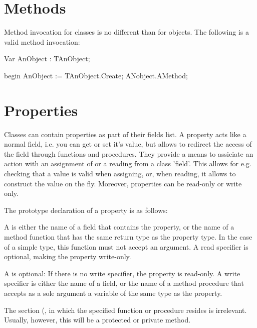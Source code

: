 \documentclass{report}
\begin{document}
\section{Methods}

Method invocation for classes is no different than for objects. The
following is a valid method invocation:
\begin{listing}
Var  AnObject : TAnObject;

begin
  AnObject := TAnObject.Create;
  ANobject.AMethod;
\end{listing}

\section{Properties}

Classes can contain properties as part of their fields list. A property
acts like a normal field, i.e. you can get or set it's value, but 
allows to redirect the access of the field through functions and 
procedures. They provide a means to assiciate an action with an assignment
of or a reading from a class 'field'. This allows for e.g. checking that a
value is valid when assigning, or, when reading, it allows to construct the
value on the fly. Moreover, properties can be read-only or write only.

The prototype declaration of a property is as follows:



A  is either the name of a field that contains the
property, or the name of a method function that has the same return type as 
the property type. In the case of a simple type, this
function must not accept an argument. A read specifier is optional, making
the property write-only.

A  is optional: If there is no write specifier, the
property is read-only. A write specifier is either the name of a field, or
the name of a method procedure that accepts as a sole argument a variable of
the same type as the property.

The section (,  in which the specified function or 
procedure resides is irrelevant. Usually, however, this will be a protected
or private method.
\end{document}
